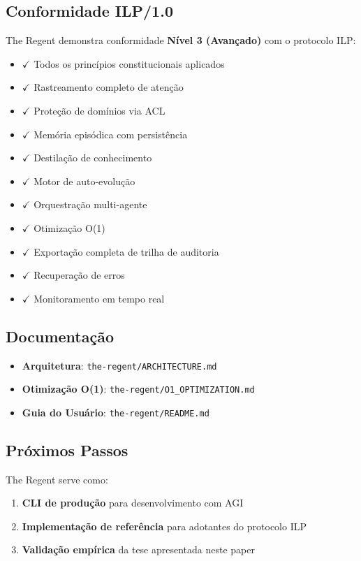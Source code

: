\documentclass[11pt]{article}
\begin{document}
\subsection{Conformidade ILP/1.0}

The Regent demonstra conformidade \textbf{Nível 3 (Avançado)} com o protocolo ILP:

\begin{itemize}
    \item $\checkmark$ Todos os princípios constitucionais aplicados
    \item $\checkmark$ Rastreamento completo de atenção
    \item $\checkmark$ Proteção de domínios via ACL
    \item $\checkmark$ Memória episódica com persistência
    \item $\checkmark$ Destilação de conhecimento
    \item $\checkmark$ Motor de auto-evolução
    \item $\checkmark$ Orquestração multi-agente
    \item $\checkmark$ Otimização O(1)
    \item $\checkmark$ Exportação completa de trilha de auditoria
    \item $\checkmark$ Recuperação de erros
    \item $\checkmark$ Monitoramento em tempo real
\end{itemize}

\subsection{Documentação}

\begin{itemize}
    \item \textbf{Arquitetura}: \texttt{the-regent/ARCHITECTURE.md}
    \item \textbf{Otimização O(1)}: \texttt{the-regent/O1\_OPTIMIZATION.md}
    \item \textbf{Guia do Usuário}: \texttt{the-regent/README.md}
\end{itemize}

\subsection{Próximos Passos}

The Regent serve como:
\begin{enumerate}
    \item \textbf{CLI de produção} para desenvolvimento com AGI
    \item \textbf{Implementação de referência} para adotantes do protocolo ILP
    \item \textbf{Validação empírica} da tese apresentada neste paper
\end{enumerate}
\end{document}
